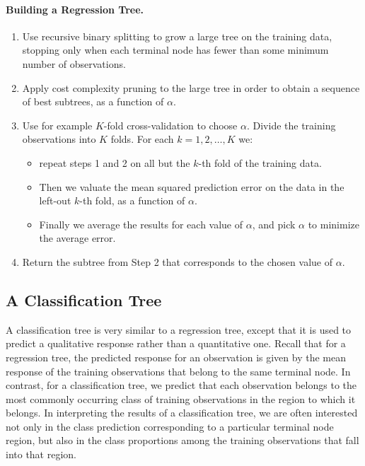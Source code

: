 \documentclass[%
oneside,                 %
final,                   %
10pt]{article}
\begin{document}
\paragraph{Building a Regression Tree.}
\begin{enumerate}
\item Use recursive binary splitting to grow a large tree on the training data, stopping only when each terminal node has fewer than some minimum number of observations.

\item Apply cost complexity pruning to the large tree in order to obtain a sequence of best subtrees, as a function of $\alpha$.

\item Use for example $K$-fold cross-validation to choose $\alpha$. Divide the training observations into $K$ folds. For each $k=1,2,\dots,K$ we: 
\begin{itemize}

  \item repeat steps 1 and 2 on all but the $k$-th fold of the training data. 

  \item Then we valuate the mean squared prediction error on the data in the left-out $k$-th fold, as a function of $\alpha$.

  \item Finally  we average the results for each value of $\alpha$, and pick $\alpha$ to minimize the average error.

\end{itemize}

\noindent
\item Return the subtree from Step 2 that corresponds to the chosen value of $\alpha$. 
\end{enumerate}

\noindent




\subsection*{A Classification Tree}

A classification tree is very similar to a regression tree, except
that it is used to predict a qualitative response rather than a
quantitative one. Recall that for a regression tree, the predicted
response for an observation is given by the mean response of the
training observations that belong to the same terminal node. In
contrast, for a classification tree, we predict that each observation
belongs to the most commonly occurring class of training observations
in the region to which it belongs. In interpreting the results of a
classification tree, we are often interested not only in the class
prediction corresponding to a particular terminal node region, but
also in the class proportions among the training observations that
fall into that region.  
\end{document}

